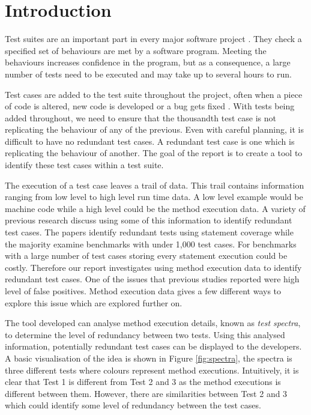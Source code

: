 \chapter{Introduction}\label{C:intro}

Test suites are an important part in every major software project \cite{jeffrey2005test}. They check a specified set of behaviours are met by a software program. Meeting the behaviours increases confidence in the program, but as a consequence, a large number of tests need to be executed and may take up to several hours to run.

Test cases are added to the test suite throughout the project, often when a piece of code is altered, new code is developed or a bug gets fixed \cite{issuetrack,whentotest}. With tests being added throughout, we need to ensure that the thousandth test case is not replicating the behaviour of any of the previous. Even with careful planning, it is difficult to have no redundant test cases. A redundant test case is one which is replicating the behaviour of another.  The goal of the report is to create a tool to identify these test cases within a test suite.

The execution of a test case leaves a trail of data. This trail contains information ranging from low level to high level run time data. A low level example would be machine code while a high level could be the method execution data. A variety of previous research \cite{wong1995effect, wong1999test, rothermel1998empirical, rothermel2002empirical,koochakzadeh2009test,zhang2011empirical,li2008static} discuss using some of this information to identify redundant test cases. The papers identify redundant tests using statement coverage while the majority examine benchmarks with under 1,000 test cases. For benchmarks with a large number of test cases storing every statement execution could be costly. Therefore our report investigates using method execution data to identify redundant test cases. One of the issues that previous studies reported were high level of false positives. Method execution data gives a few different ways to explore this issue which are explored further on. 

The tool developed can analyse method execution details, known as \textit{test spectra}, to determine the level of redundancy between two tests. Using this analysed information, potentially redundant test cases can be displayed to the developers. A basic visualisation of the idea is shown in Figure \ref{fig:spectra}, the spectra is three different tests where colours represent method executions. Intuitively, it is clear that Test 1 is different from Test 2 and 3 as the method executions is different between them. However, there are similarities between Test 2 and 3 which could identify some level of redundancy between the test cases. 

